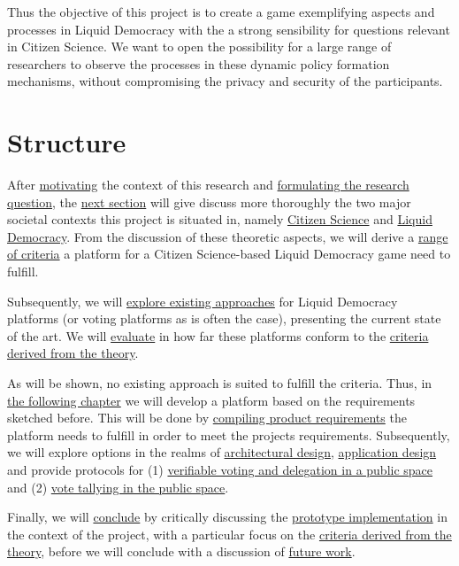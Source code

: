 Thus the objective of this project is to create a game exemplifying aspects and processes in Liquid Democracy with the a strong sensibility for questions relevant in Citizen Science. We want to open the possibility for a large range of researchers to observe the processes in these dynamic policy formation mechanisms, without compromising the privacy and security of the participants.

\section{Structure}
\label{sec:structure}


After \hyperref[sec:Motivation]{motivating} the context of this research and \hyperref[sec:Objective]{formulating the research question}, the \hyperref[ch:Theory]{next section} will give discuss more thoroughly the two major societal contexts this project is situated in, namely \hyperref[sec:Theory_CS]{Citizen Science} and \hyperref[sec:Liquid_Democracy]{Liquid Democracy}. From the discussion of these theoretic aspects, we will derive a \hyperref[sec:Criteria]{range of criteria} a platform for a Citizen Science-based Liquid Democracy game need to fulfill.

Subsequently, we will \hyperref[ch:RelatedWork]{explore existing approaches} for Liquid Democracy platforms (or voting platforms as is often the case), presenting the current state of the art. We will \hyperref[sec:Evaluation]{evaluate} in how far these platforms conform to the \hyperref[sec:Criteria]{criteria derived from the theory}. 

As will be shown, no existing approach is suited to fulfill the criteria. Thus, in \hyperref[ch:ProjectRequirements]{the following chapter} we will develop a platform based on the requirements sketched before. This will be done by \hyperref[sec:SoftwareRequirements]{compiling product requirements} the platform needs to fulfill in order to meet the projects requirements. Subsequently, we will explore options in the realms of \hyperref[sec:ArchitecturalDesign]{architectural design}, \hyperref[sec:ApplicationDesign]{application design} and provide protocols for (1) \hyperref[sec:PublicInteractionProtocol]{verifiable voting and delegation in a public space} and (2) \hyperref[sec:VoteTallyingProtocol]{vote tallying in the public space}.

Finally, we will \hyperref[ch:Conclusion]{conclude} by critically discussing the \hyperref[sec:DiscussionImplementation]{prototype implementation} in the context of the project, with a particular focus on the \hyperref[sec:Criteria]{criteria derived from the theory}, before we will conclude with a discussion of \hyperref[sec:FutureWork]{future work}.